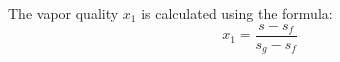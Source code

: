 The vapor quality \( x_1 \) is calculated using the formula:  
\[
x_1 = \frac{s - s_f}{s_g - s_f}
\]